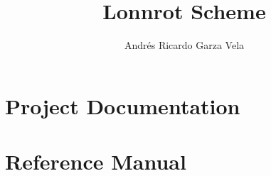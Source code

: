 \documentclass[nobib]{tufte-book-tai}
\title{Lonnrot Scheme}
\author{Andrés Ricardo Garza Vela}
\begin{document}
\maketitlepage



\newpage

\clearpage


\setcounter{page}{3}
\setcounter{tocdepth}{2}
\tableofcontents

\frontmatter
\setcounter{page}{5}


%

\mainmatter
\setcounter{secnumdepth}{2}

\part{Project Documentation}

\clearpage


\clearpage


\clearpage


\clearpage

\part{Reference Manual}\label{p:2}


\clearpage
 

\backmatter


\clearpage


\clearpage
\thispagestyle{empty}

\nocite{*}

\begin{fullwidth}

\end{fullwidth}

\end{document}
